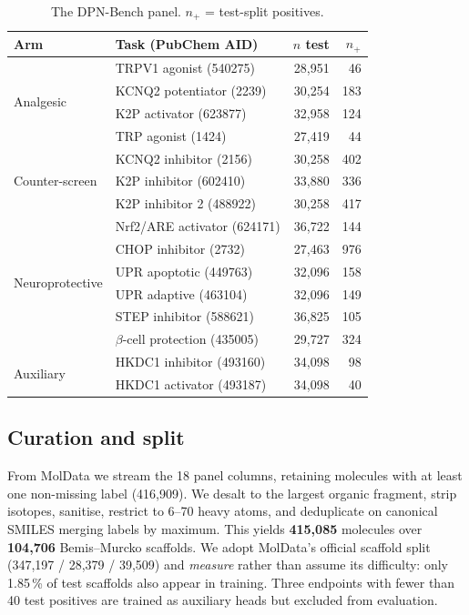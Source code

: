 \documentclass[conference]{IEEEtran}
\begin{document}
\begin{table}[t]
\caption{The DPN-Bench panel. $n_{+}$ = test-split positives.}
\label{tab:panel}
\centering\footnotesize
\begin{tabular}{@{}llrr@{}}
\toprule
Arm & Task (PubChem AID) & $n$ test & $n_{+}$ \\
\midrule
\multirow{4}{*}{Analgesic}
 & TRPV1 agonist (540275)        & 28{,}951 & 46 \\
 & KCNQ2 potentiator (2239)      & 30{,}254 & 183 \\
 & K2P activator (623877)        & 32{,}958 & 124 \\
 & TRP agonist (1424)            & 27{,}419 & 44 \\
\midrule
\multirow{3}{*}{Counter-screen}
 & KCNQ2 inhibitor (2156)        & 30{,}258 & 402 \\
 & K2P inhibitor (602410)        & 33{,}880 & 336 \\
 & K2P inhibitor 2 (488922)      & 30{,}258 & 417 \\
\midrule
\multirow{6}{*}{Neuroprotective}
 & Nrf2/ARE activator (624171)   & 36{,}722 & 144 \\
 & CHOP inhibitor (2732)         & 27{,}463 & 976 \\
 & UPR apoptotic (449763)        & 32{,}096 & 158 \\
 & UPR adaptive (463104)         & 32{,}096 & 149 \\
 & STEP inhibitor (588621)       & 36{,}825 & 105 \\
 & $\beta$-cell protection (435005) & 29{,}727 & 324 \\
\midrule
\multirow{2}{*}{Auxiliary}
 & HKDC1 inhibitor (493160)      & 34{,}098 & 98 \\
 & HKDC1 activator (493187)      & 34{,}098 & 40 \\
\bottomrule
\end{tabular}
\end{table}

\subsection{Curation and split}
From MolData we stream the 18 panel columns, retaining molecules with at least
one non-missing label (416{,}909). We desalt to the largest organic fragment,
strip isotopes, sanitise, restrict to 6--70 heavy atoms, and deduplicate on
canonical SMILES merging labels by maximum. This yields \textbf{415{,}085}
molecules over \textbf{104{,}706} Bemis--Murcko scaffolds. We adopt MolData's
official scaffold split (347{,}197 / 28{,}379 / 39{,}509) and \emph{measure}
rather than assume its difficulty: only 1.85\,\% of test scaffolds also appear in
training. Three endpoints with fewer than 40 test positives are trained as
auxiliary heads but excluded from evaluation.
\end{document}
